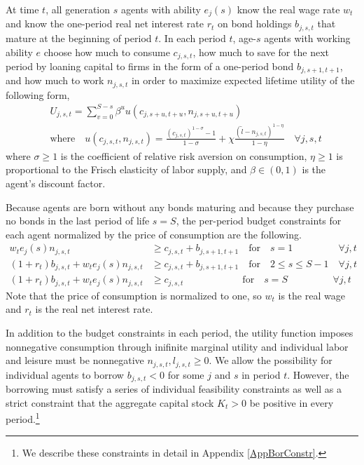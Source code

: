 \documentclass[letterpaper,12pt]{article}
\theoremstyle{definition}
\begin{document}
\begin{spacing}{1.5}
    At time $t$, all generation $s$ agents with ability $e_j(s)$ know the real wage rate $w_t$ and know the one-period real net interest rate $r_t$ on bond holdings $b_{j,s,t}$ that mature at the beginning of period $t$. In each period $t$, age-$s$ agents with working ability $e$ choose how much to consume $c_{j,s,t}$, how much to save for the next period by loaning capital to firms in the form of a one-period bond $b_{j,s+1,t+1}$, and how much to work $n_{j,s,t}$ in order to maximize expected lifetime utility of the following form,
    \begin{equation}\label{EqUtilMax}
      \begin{split}
        &U_{j,s,t} = \sum_{v=0}^{S-s}\beta^u u\left(c_{j,s+u,t+u},n_{j,s+u,t+u}\right) \\
        &\text{where} \quad u\left(c_{j,s,t},n_{j,s,t}\right) = \frac{\left(c_{j,s,t}\right)^{1-\sigma} - 1}{1-\sigma} + \chi\frac{(\tilde{l}-n_{j,s,t})^{1-\eta}}{1-\eta} \quad\forall j,s,t
      \end{split}
    \end{equation}
    where $\sigma\geq 1$ is the coefficient of relative risk aversion on consumption, $\eta\geq 1$ is proportional to the Frisch elasticity of labor supply, and $\beta\in(0,1)$ is the agent's discount factor.

    Because agents are born without any bonds maturing and because they purchase no bonds in the last period of life $s=S$, the per-period budget constraints for each agent normalized by the price of consumption are the following.
    \begin{align}
      w_t e_j(s)n_{j,s,t} &\geq c_{j,s,t} + b_{j,s+1,t+1} \quad \text{for} \quad s = 1 \quad\quad\quad\quad\:\:\: \forall j,t \label{EqBC1} \\
      \left(1 + r_t\right) b_{j,s,t} + w_t e_j(s)n_{j,s,t} &\geq c_{j,s,t} + b_{j,s+1,t+1} \quad \text{for} \quad 2\leq s \leq S-1 \quad \forall j,t \label{EqBC2} \\
      \left(1 + r_t\right) b_{j,s,t} + w_t e_j(s)n_{j,s,t} &\geq c_{j,s,t} \quad\quad\quad\quad\quad\quad \text{for} \quad s = S \quad\quad\quad\quad\:\:\, \forall j,t \label{EqBC3}
    \end{align}
    Note that the price of consumption is normalized to one, so $w_t$ is the real wage and $r_t$ is the real net interest rate.

    In addition to the budget constraints in each period, the utility function imposes nonnegative consumption through inifinite marginal utility and individual labor and leisure must be nonnegative $n_{j,s,t},l_{j,s,t}\geq 0$. We allow the possibility for individual agents to borrow $b_{j,s,t}<0$ for some $j$ and $s$ in period $t$. However, the borrowing must satisfy a series of individual feasibility constraints as well as a strict constraint that the aggregate capital stock $K_t>0$ be positive in every period.\footnote{We describe these constraints in detail in Appendix \ref{AppBorConstr}.}


\end{spacing}
\end{document}
